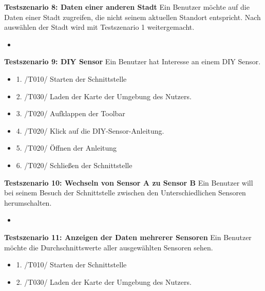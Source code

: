 \textbf{Testszenario 8: Daten einer anderen Stadt}
\newline
Ein Benutzer möchte auf die Daten einer Stadt zugreifen, die nicht seinem aktuellen Standort entspricht. Nach auswählen der Stadt wird mit Testszenario 1 weitergemacht.
\begin{itemize}
    \item 
\end{itemize}

\textbf{Testszenario 9: DIY Sensor}
\newline
Ein Benutzer hat Interesse an einem DIY Sensor.
\begin{itemize}
     \item 1. /T010/ Starten der Schnittstelle
    \item 2. /T030/ Laden der Karte der Umgebung des Nutzers.
    \item 3. /T020/ Aufklappen der Toolbar
    \item 4. /T020/ Klick auf die DIY-Sensor-Anleitung.
    \item 5. /T020/ Öffnen der Anleitung
    \item 6. /T020/ Schließen der Schnittstelle
\end{itemize}

\textbf{Testszenario 10: Wechseln von Sensor A zu Sensor B}
\newline
Ein Benutzer will bei seinem Besuch der Schnittstelle zwischen den Unterschiedlichen Sensoren herumschalten. 
\begin{itemize}
    \item
\end{itemize}

\textbf{Testszenario 11: Anzeigen der Daten mehrerer Sensoren}
\newline
Ein Benutzer möchte die Durchschnittswerte aller ausgewählten Sensoren sehen.
\begin{itemize}
    \item 1. /T010/ Starten der Schnittstelle
    \item 2. /T030/ Laden der Karte der Umgebung des Nutzers.
\end{itemize}